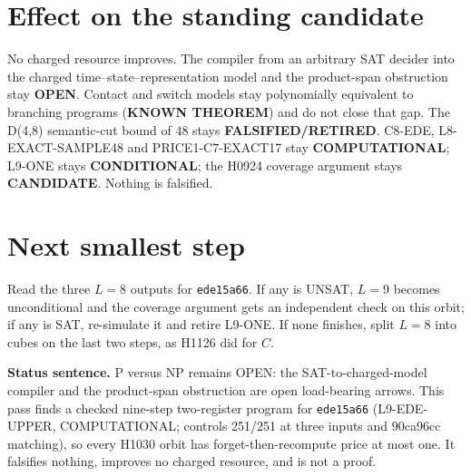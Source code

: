 \documentclass[11pt]{article}
\begin{document}
\section*{Effect on the standing candidate}
No charged resource improves. The compiler from an arbitrary SAT decider into the charged time--state--representation model and the product-span obstruction stay \textbf{OPEN}. Contact and switch models stay polynomially equivalent to branching programs (\textbf{KNOWN THEOREM}) and do not close that gap. The D(4,8) semantic-cut bound of $48$ stays \textbf{FALSIFIED/RETIRED}. C8-EDE, L8-EXACT-SAMPLE48 and PRICE1-C7-EXACT17 stay \textbf{COMPUTATIONAL}; L9-ONE stays \textbf{CONDITIONAL}; the H0924 coverage argument stays \textbf{CANDIDATE}. Nothing is falsified.

\section*{Next smallest step}
Read the three $L=8$ outputs for \texttt{ede15a66}. If any is UNSAT, $L=9$ becomes unconditional and the coverage argument gets an independent check on this orbit; if any is SAT, re-simulate it and retire L9-ONE. If none finishes, split $L=8$ into cubes on the last two steps, as H1126 did for $C$.

\bigskip
\noindent\textbf{Status sentence.} P versus NP remains OPEN: the SAT-to-charged-model compiler and the product-span obstruction are open load-bearing arrows. This pass finds a checked nine-step two-register program for \texttt{ede15a66} (L9-EDE-UPPER, COMPUTATIONAL; controls 251/251 at three inputs and 90ca96cc matching), so every H1030 orbit has forget-then-recompute price at most one. It falsifies nothing, improves no charged resource, and is not a proof.
\end{document}
